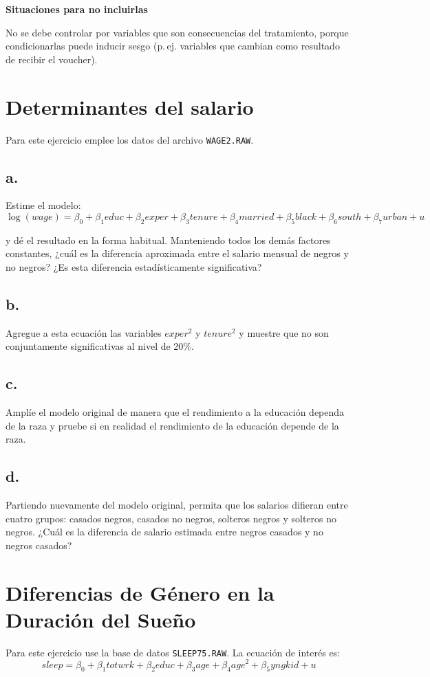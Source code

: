 \documentclass[12pt]{article}
\begin{document}
\textbf{Situaciones para no incluirlas}

No se debe controlar por variables que son consecuencias del tratamiento, porque condicionarlas puede inducir sesgo (p.\,ej. variables que cambian como resultado de recibir el voucher).

\section{Determinantes del salario}

Para este ejercicio emplee los datos del archivo \texttt{WAGE2.RAW}.

\subsection*{a.}
Estime el modelo:
\[
\log(wage) = \beta_0 + \beta_1 educ + \beta_2 exper + \beta_3 tenure + \beta_4 married + \beta_5 black + \beta_6 south + \beta_7 urban + u
\]

y dé el resultado en la forma habitual. Manteniendo todos los demás factores constantes, ¿cuál es la diferencia aproximada entre el salario mensual de negros y no negros? 
¿Es esta diferencia estadísticamente significativa?

\subsection*{b.}
Agregue a esta ecuación las variables $exper^2$ y $tenure^2$ y muestre que no son conjuntamente significativas al nivel de 20\%.

\subsection*{c.}
Amplíe el modelo original de manera que el rendimiento a la educación dependa de la raza y pruebe si en realidad el rendimiento de la educación depende de la raza.

\subsection*{d.}
Partiendo nuevamente del modelo original, permita que los salarios difieran entre cuatro grupos: casados negros, casados no negros, solteros negros y solteros no negros. 
¿Cuál es la diferencia de salario estimada entre negros casados y no negros casados?

\section{Diferencias de Género en la Duración del Sueño}
Para este ejercicio use la base de datos \texttt{SLEEP75.RAW}. 
La ecuación de interés es:
\[
sleep = \beta_{0} + \beta_{1}totwrk + \beta_{2}educ + \beta_{3}age + \beta_{4}age^{2} + \beta_{5}yngkid + u
\]
\end{document}
